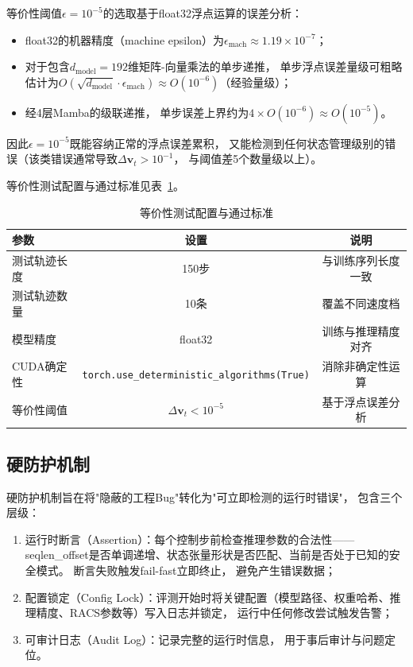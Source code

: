 等价性阈值$\epsilon = 10^{-5}$的选取基于float32浮点运算的误差分析：

\begin{itemize}
  \item float32的机器精度（machine epsilon）为$\epsilon_{\text{mach}} \approx 1.19 \times 10^{-7}$；
     \item 对于包含$d_{\text{model}} = 192$维矩阵-向量乘法的单步递推，
    单步浮点误差量级可粗略估计为$O(\sqrt{d_{\text{model}}} \cdot \epsilon_{\text{mach}}) \approx O(10^{-6})$（经验量级）；
     \item 经4层Mamba的级联递推，
    单步误差上界约为$4 \times O(10^{-6}) \approx O(10^{-5})$。
     \end{itemize}

因此$\epsilon = 10^{-5}$既能容纳正常的浮点误差累积，
又能检测到任何状态管理级别的错误（该类错误通常导致$\Delta \mathbf{v}_t > 10^{-1}$，
与阈值差5个数量级以上）。

等价性测试配置与通过标准见表~\ref{tab:equiv_test_config}。
\begin{table}[htbp]
\centering
\caption{等价性测试配置与通过标准}
\label{tab:equiv_test_config}
\begin{tabular}{lcc}
\toprule
\textbf{参数} & \textbf{设置} & \textbf{说明} \\
\midrule
测试轨迹长度 & 150步 & 与训练序列长度一致 \\
测试轨迹数量 & 10条 & 覆盖不同速度档 \\
模型精度 & float32 & 训练与推理精度对齐 \\
CUDA确定性 & \texttt{torch.use\_deterministic\_algorithms(True)} & 消除非确定性运算 \\
等价性阈值 & $\Delta \mathbf{v}_t < 10^{-5}$ & 基于浮点误差分析 \\
\bottomrule
\end{tabular}
\end{table}
\FloatBarrier

\subsection{硬防护机制}

硬防护机制旨在将"隐蔽的工程Bug"转化为"可立即检测的运行时错误"，
包含三个层级：

\begin{enumerate}
  \item 运行时断言（Assertion）：每个控制步前检查推理参数的合法性——seqlen\_offset是否单调递增、状态张量形状是否匹配、当前是否处于已知的安全模式。
    断言失败触发fail-fast立即终止，
    避免产生错误数据；
     \item 配置锁定（Config Lock）：评测开始时将关键配置（模型路径、权重哈希、推理精度、RACS参数等）写入日志并锁定，
    运行中任何修改尝试触发告警；
     \item 可审计日志（Audit Log）：记录完整的运行时信息，
    用于事后审计与问题定位。
     \end{enumerate}

